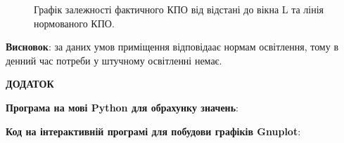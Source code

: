 \documentclass[a4paper,14pt]{extreport}
\begin{document}
\begin{figure}[h]
\caption{Графік залежності фактичного КПО від відстані до вікна L та лінія нормованого КПО.}
\end{figure}
\textbf{Висновок}: за даних умов приміщення відповідаає нормам освітлення, тому в денний час потреби у штучному освітленні немає.



\newpage
\begin{center}\textbf{ДОДАТОК}\end{center}
\textbf{Програма на мові Python для обрахунку значень}:


\textbf{Код на інтерактивній програмі для побудови графіків Gnuplot}:

\end{document}
